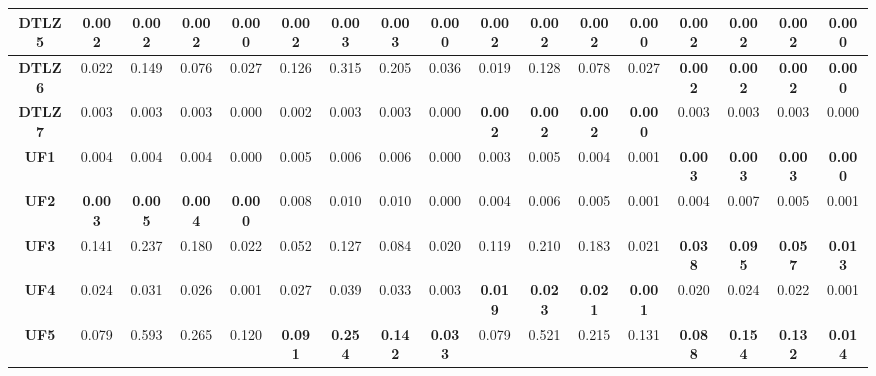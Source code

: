 \begin{table*}[t]
\begin{tabular}{cc|c|c|c|c|c|c|c|c|c|c|c|c|c|c|c}
\multicolumn{1}{c|}{\textbf{DTLZ5}} & 0.002          & 0.002          & 0.002          & 0.000          & 0.002          & 0.003          & 0.003          & 0.000          & \textbf{0.002} & \textbf{0.002} & \textbf{0.002} & \textbf{0.000} & 0.002          & 0.002          & 0.002          & 0.000          \\ \hline
\multicolumn{1}{c|}{\textbf{DTLZ6}} & 0.022          & 0.149          & 0.076          & 0.027          & 0.126          & 0.315          & 0.205          & 0.036          & 0.019          & 0.128          & 0.078          & 0.027          & \textbf{0.002} & \textbf{0.002} & \textbf{0.002} & \textbf{0.000} \\ \hline
\multicolumn{1}{c|}{\textbf{DTLZ7}} & 0.003          & 0.003          & 0.003          & 0.000          & 0.002          & 0.003          & 0.003          & 0.000          & \textbf{0.002} & \textbf{0.002} & \textbf{0.002} & \textbf{0.000} & 0.003          & 0.003          & 0.003          & 0.000          \\ \hline
\multicolumn{1}{c|}{\textbf{UF1}}   & 0.004          & 0.004          & 0.004          & 0.000          & 0.005          & 0.006          & 0.006          & 0.000          & 0.003          & 0.005          & 0.004          & 0.001          & \textbf{0.003} & \textbf{0.003} & \textbf{0.003} & \textbf{0.000} \\ \hline
\multicolumn{1}{c|}{\textbf{UF2}}   & \textbf{0.003} & \textbf{0.005} & \textbf{0.004} & \textbf{0.000} & 0.008          & 0.010          & 0.010          & 0.000          & 0.004          & 0.006          & 0.005          & 0.001          & 0.004          & 0.007          & 0.005          & 0.001          \\ \hline
\multicolumn{1}{c|}{\textbf{UF3}}   & 0.141          & 0.237          & 0.180          & 0.022          & 0.052          & 0.127          & 0.084          & 0.020          & 0.119          & 0.210          & 0.183          & 0.021          & \textbf{0.038} & \textbf{0.095} & \textbf{0.057} & \textbf{0.013} \\ \hline
\multicolumn{1}{c|}{\textbf{UF4}}   & 0.024          & 0.031          & 0.026          & 0.001          & 0.027          & 0.039          & 0.033          & 0.003          & \textbf{0.019} & \textbf{0.023} & \textbf{0.021} & \textbf{0.001} & 0.020          & 0.024          & 0.022          & 0.001          \\ \hline
\multicolumn{1}{c|}{\textbf{UF5}}   & 0.079          & 0.593          & 0.265          & 0.120          & \textbf{0.091} & \textbf{0.254} & \textbf{0.142} & \textbf{0.033} & 0.079          & 0.521          & 0.215          & 0.131          & \textbf{0.088} & \textbf{0.154} & \textbf{0.132} & \textbf{0.014} \\ \hline

\end{tabular}
\end{table*}
